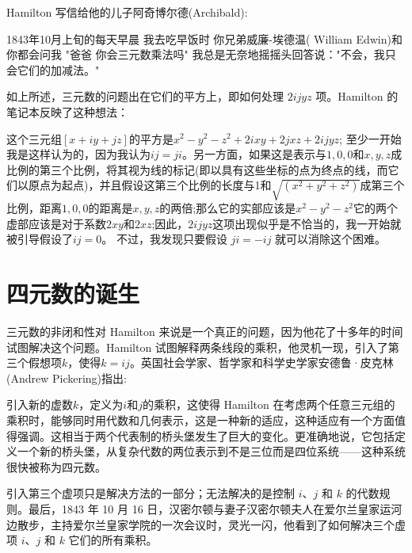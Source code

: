 Hamilton 写信给他的儿子阿奇博尔德(Archibald):

\begin{CJK}{UTF8}{gkai}
    1843年10月上旬的每天早晨 我去吃早饭时 你兄弟威廉-埃德温( William Edwin)和你都会问我 "爸爸 你会三元数乘法吗" 我总是无奈地摇摇头回答说："不会，我只会它们的加减法。" \cite{bib5-8}
\end{CJK}

如上所述，三元数的问题出在它们的平方上，即如何处理 $2 i j y z$ 项。Hamilton 的笔记本反映了这种想法：

\begin{CJK}{UTF8}{gkai}
    这个三元组$[x+i y+j z]$的平方是$x^{2}-y^{2}-z^{2}+2 i x y+2 j x z+$$2 i j y z$; 至少一开始我是这样认为的，因为我认为$i j=j i$。另一方面，如果这是表示与$1,0,0$和$x, y, z$成比例的第三个比例，将其视为线的标记(即以具有这些坐标的点为终点的线，而它们以原点为起点)，并且假设这第三个比例的长度与1和$\sqrt{\left(x^{2}+y^{2}+z^{2}\right)}$成第三个比例，距离$1,0,0$的距离是$x, y, z$的两倍;那么它的实部应该是$x^{2}-y^{2}-z^{2}$它的两个虚部应该是对于系数$2 x y$和$2 x z$;因此，$2 i j y z$这项出现似乎是不恰当的，我一开始就被引导假设了$i j=0$。
        不过，我发现只要假设 $j i=-i j$ 就可以消除这个困难。\cite{bib5-9}
\end{CJK}

\section{四元数的诞生}
三元数的非闭和性对 Hamilton 来说是一个真正的问题，因为他花了十多年的时间试图解决这个问题。Hamilton 试图解释两条线段的乘积，他灵机一现，引入了第三个假想项$k$，使得$k=i j$。英国社会学家、哲学家和科学史学家安德鲁·皮克林(Andrew Pickering)指出:

\begin{CJK}{UTF8}{gkai}
    引入新的虚数$k$，定义为$i$和$j$的乘积，这使得 Hamilton 在考虑两个任意三元组的乘积时，能够同时用代数和几何表示，这是一种新的适应，这种适应有一个方面值得强调。这相当于两个代表制的桥头堡发生了巨大的变化。更准确地说，它包括定义一个新的桥头堡，从复杂代数的两位表示到不是三位而是四位系统——这种系统很快被称为四元数。\cite{bib5-10}
\end{CJK}



引入第三个虚项只是解决方法的一部分；无法解决的是控制 $i、j$ 和 $k$ 的代数规则。最后，1843 年 10 月 16 日，汉密尔顿与妻子汉密尔顿夫人在爱尔兰皇家运河边散步，主持爱尔兰皇家学院的一次会议时，灵光一闪，他看到了如何解决三个虚项 $i、j$ 和 $k$ 它们的所有乘积。\cite{bib5-11}

